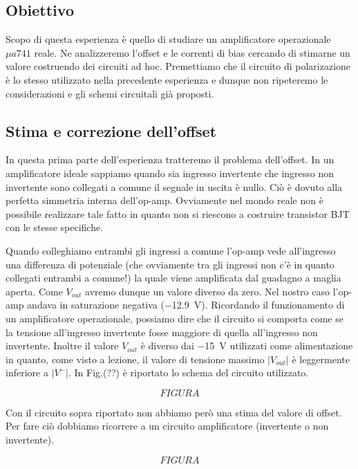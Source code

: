 \subsection{Obiettivo}
Scopo di questa esperienza è quello di studiare un amplificatore operazionale $\mu a 741$ reale. Ne analizzeremo l'offset e le correnti di bias cercando di stimarne un valore costruendo dei circuiti ad hoc. Premettiamo che il circuito di polarizazione è lo stesso utilizzato nella precedente esperienza e dunque non ripeteremo le considerazioni e gli schemi circuitali già proposti. 



\subsection{Stima e correzione dell'offset}

In questa prima parte dell'esperienza tratteremo il problema dell'offset. In un amplificatore ideale sappiamo quando sia ingresso invertente che ingresso non invertente sono collegati a comune il segnale in uscita è nullo. Ciò è dovuto alla perfetta simmetria interna dell'op-amp. Ovviamente nel mondo reale non è possibile realizzare tale fatto in quanto non si riescono a costruire transistor BJT con le stesse specifiche. 

Quando colleghiamo entrambi gli ingressi a comune l'op-amp vede all'ingresso una differenza di potenziale (che ovviamente tra gli ingressi non c'è in quanto collegati entrambi a comune!) la quale viene amplificata dal guadagno a maglia aperta. Come $V_{out}$ avremo dunque un valore diverso da zero. Nel nostro caso l'op-amp andava in saturazione negativa (\SI{-12.9}{\volt}). Ricordando il funzionamento di un amplificatore operazionale, possiamo dire che il circuito si comporta come se la tensione all'ingresso invertente fosse maggiore di quella all'ingresso non invertente. Inoltre il valore $V_{out}$ è diverso dai \SI{-15}{\volt} utilizzati come alimentazione in quanto, come visto a lezione, il valore di tensione massimo $|V_{out}|$ è leggermente inferiore a $|V^-|$. In Fig.(??) è riportato lo schema del circuito utilizzato.


$$FIGURA$$



Con il circuito sopra riportato non abbiamo però una stima del valore di offset. Per fare ciò dobbiamo ricorrere a un circuito amplificatore (invertente o non invertente).

$$FIGURA$$


